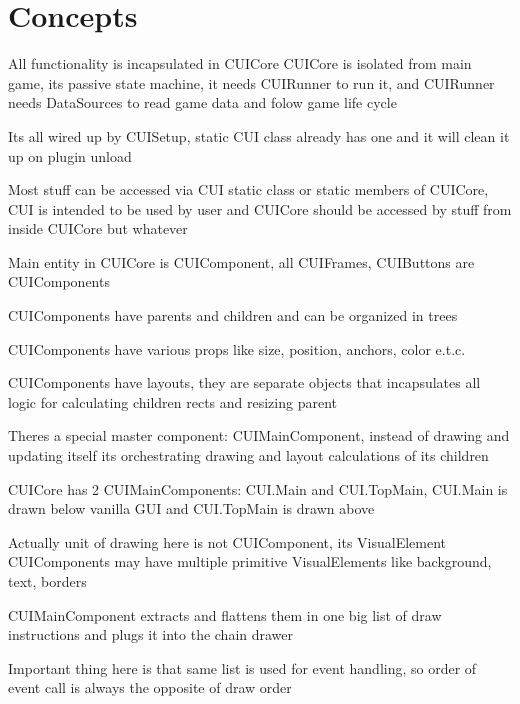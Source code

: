 \chapter{Concepts }
\hypertarget{_concepts}{}\label{_concepts}
\label{_concepts_md__docs_2_sources_2_overview_2_concepts}%
%


All functionality is incapsulated in CUICore CUICore is isolated from main game, it\textquotesingle{}s passive state machine, it needs CUIRunner to run it, and CUIRunner needs Data\+Sources to read game data and folow game life cycle

It\textquotesingle{}s all wired up by CUISetup, static CUI class already has one and it will clean it up on plugin unload

Most stuff can be accessed via CUI static class or static members of CUICore, CUI is intended to be used by user and CUICore should be accessed by stuff from inside CUICore but whatever

Main entity in CUICore is CUIComponent, all CUIFrames, CUIButtons are CUIComponents

CUIComponents have parents and children and can be organized in trees

CUIComponents have various props like size, position, anchors, color e.\+t.\+c.

CUIComponents have layouts, they are separate objects that incapsulates all logic for calculating children rects and resizing parent

There\textquotesingle{}s a special master component:\+ CUIMain\+Component, instead of drawing and updating itself it\textquotesingle{}s orchestrating drawing and layout calculations of it\textquotesingle{}s children

CUICore has 2 CUIMain\+Components:\+ CUI.\+Main and CUI.\+Top\+Main, CUI.\+Main is drawn below vanilla GUI and CUI.\+Top\+Main is drawn above

Actually unit of drawing here is not CUIComponent, it\textquotesingle{}s Visual\+Element CUIComponents may have multiple primitive Visual\+Elements like background, text, borders

CUIMain\+Component extracts and flattens them in one big list of draw instructions and plugs it into the chain drawer

Important thing here is that same list is used for event handling, so order of event call is always the opposite of draw order 